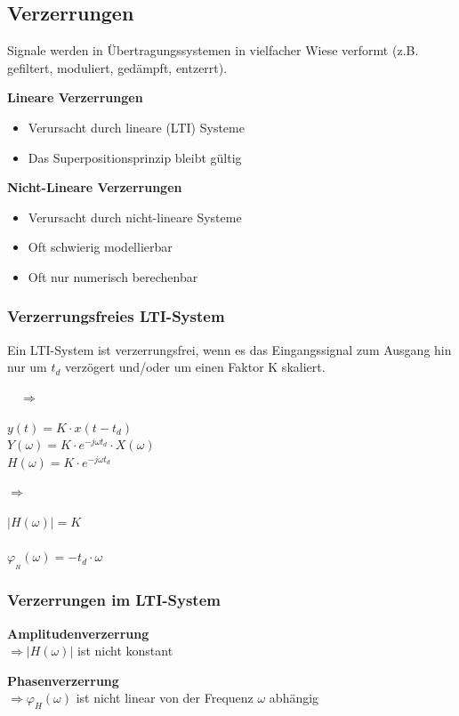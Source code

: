 \subsection{Verzerrungen}
	Signale werden in \"Ubertragungssystemen in vielfacher Wiese verformt (z.B. gefiltert, moduliert, gedämpft, entzerrt).
	\begin{multicols}{2}
		\textbf{Lineare Verzerrungen}
			\begin{itemize}
				\item Verursacht durch lineare (LTI) Systeme
				\item Das Superpositionsprinzip bleibt gültig
			\end{itemize}
			\columnbreak
			
		\textbf{Nicht-Lineare Verzerrungen}
			\begin{itemize}
				\item Verursacht durch nicht-lineare Systeme
				\item Oft schwierig modellierbar
				\item Oft nur numerisch berechenbar
			\end{itemize}
	\end{multicols}
	
	\subsubsection{Verzerrungsfreies LTI-System}
		\begin{minipage}[c]{6cm}
			Ein LTI-System ist verzerrungsfrei, wenn es das Eingangssignal zum Ausgang hin nur um $t_d$ verz\"ogert und/oder um einen Faktor K skaliert. 
		\end{minipage}
		$\quad \Longrightarrow \quad$
		\begin{minipage}[c]{4cm}
			$y(t) = K \cdot x(t-t_d)$  
			\\[0.2cm]
			$Y(\omega) = K \cdot e^{-j\omega t_d} \cdot X(\omega)$\\[0.2cm]
			$\boxed{H(\omega) = K \cdot e^{-j\omega t_d}}$
		\end{minipage}
		$\Longrightarrow \quad$
		\begin{minipage}[c]{5cm}
			$|H(\omega)| = K$\\ \\
			$\varphi_{_H}(\omega) = -t_d \cdot \omega$
		\end{minipage}
	
	\subsubsection{Verzerrungen im LTI-System}
		\begin{minipage}[t]{7cm}
			\textbf{Amplitudenverzerrung}\\
				$\Rightarrow |H(\omega)|$ ist nicht konstant 
				
		\end{minipage}
		\begin{minipage}[t]{10cm}
			\textbf{Phasenverzerrung}\\
				$\Rightarrow \varphi_H (\omega)$ ist nicht linear von der Frequenz $\omega$ abhängig
		\end{minipage}


